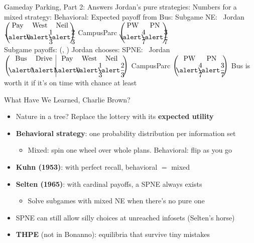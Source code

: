 \begin{frame}{Gameday Parking, Part 2: Answers}
\small
Jordan's pure strategies:  \quad Numbers for a mixed strategy:  \quad Behavioral: 
\bsk
Expected payoff from Bus: 
\bsk
Subgame NE: \ Jordan $\begin{pmatrix}\text{Pay} & \text{West} & \text{Neil}\\ \ans{0.3in}{$0$} & \ans{0.3in}{$\dfrac13$} & \ans{0.3in}{$\dfrac23$}\end{pmatrix}$
\quad CampusParc $\begin{pmatrix}\text{PW} & \text{PN}\\ \ans{0.3in}{$\dfrac47$} & \ans{0.3in}{$\dfrac37$}\end{pmatrix}$
\\[6pt]
Subgame payoffs: (, ) \qquad Jordan chooses: 
\bsk
SPNE: \ Jordan $\beh[cc|ccc]{\text{Bus} & \text{Drive} & \text{Pay} & \text{West} & \text{Neil}}{\ans{0.3in}{$0$} & \ans{0.3in}{$1$} & \ans{0.3in}{$0$} & \ans{0.3in}{$\dfrac13$} & \ans{0.3in}{$\dfrac23$}}$
\quad CampusParc $\beh{\text{PW} & \text{PN}}{\ans{0.3in}{$\dfrac47$} & \ans{0.3in}{$\dfrac37$}}$
\bsk
Bus is worth it if it's on time with chance at least 
\vspace{-0.3in}
\end{frame}

\begin{frame}{What Have We Learned, Charlie Brown?}
\begin{itemize}
    \item Nature in a tree? Replace the lottery with its \textbf{expected utility}
    \item \textbf{Behavioral strategy}: one probability distribution per information set
    \begin{itemize}
        \item Mixed: spin one wheel over whole plans. Behavioral: flip as you go
    \end{itemize}
    \item \textbf{Kuhn (1953)}: with perfect recall, behavioral $=$ mixed
    \item \textbf{Selten (1965)}: with cardinal payoffs, a SPNE always exists
    \begin{itemize}
        \item Solve subgames with mixed NE when there's no pure one
    \end{itemize}
    \item SPNE can still allow silly choices at unreached infosets (Selten's horse)
    \item \textbf{THPE} (not in Bonanno): equilibria that survive tiny mistakes
\end{itemize}
\vfill
\vspace{-0.4in}
\end{frame}

